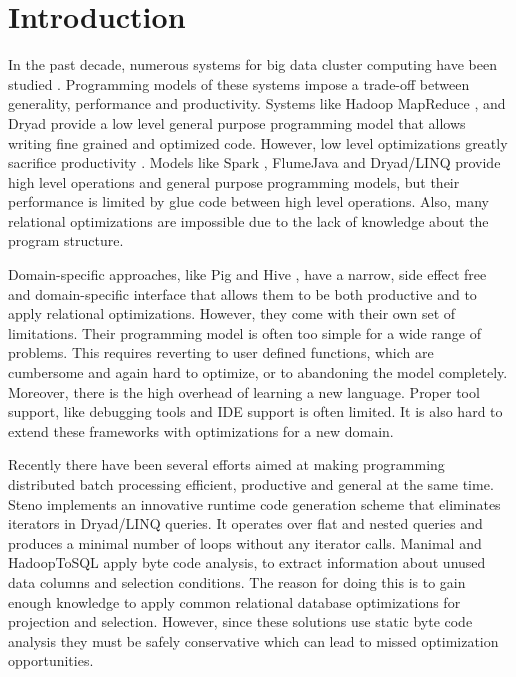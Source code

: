 \section{Introduction}
\label{sec:introduction}

In the past decade, numerous systems for big data cluster computing have been
studied \cite{dean_mapreduce:_2008, yu_dryadlinq:_2008-1, olston_pig_2008-1,
thusoo_hive_2010-1, spark-nsdi}. Programming models of these systems impose a
trade-off between generality, performance and productivity. Systems like Hadoop
MapReduce \cite{hadoop}, and Dryad \cite{isard_dryad:_2007} provide a low level
general purpose programming model that allows writing fine grained and optimized
code. However, low level optimizations greatly sacrifice productivity
\cite{chambers_flumejava:_2010}. Models like Spark \cite{spark-nsdi}, FlumeJava
\cite{chambers_flumejava:_2010} and Dryad/LINQ \cite{yu_dryadlinq:_2008-1}
provide high level operations and general purpose programming models, but their
performance is limited by glue code between high level operations. Also, many
relational optimizations are impossible due to the lack of knowledge about the
program structure.

Domain-specific approaches, like Pig \cite{olston_pig_2008-1} and Hive
\cite{thusoo_hive_2010-1}, have a narrow, side effect free and
domain-specific interface that allows them to be both productive and to apply relational optimizations.
However, they come with their own set of limitations. Their programming model is
often too simple for a wide range of problems. This requires reverting to user
defined functions, which are cumbersome and again hard to optimize, or to
abandoning the model completely. Moreover, there is the high overhead of
learning a new language.
Proper tool support, like debugging tools and IDE support is often limited. It
is also hard to extend these frameworks with optimizations for a new domain.

Recently there have been several efforts aimed at making programming
distributed batch processing efficient, productive and general at the same time.
Steno \cite{murray_steno:_2011} implements an innovative runtime code generation
scheme that eliminates iterators in Dryad/LINQ queries. It operates over flat
and nested queries and produces a minimal number of loops without any iterator
calls. Manimal \cite{jahani_automatic_2011} and HadoopToSQL
\cite{iu_hadooptosql:_2010} apply byte code analysis, to extract information
about unused data columns and selection conditions. The reason for doing this is to gain enough
knowledge to apply common relational database optimizations for projection and
selection. However, since these solutions use static byte code analysis they
must be safely conservative which can lead to missed optimization opportunities.


